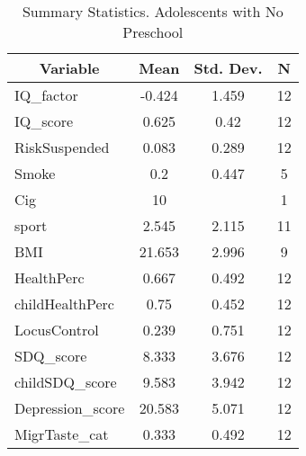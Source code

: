 
\begin{table}[htbp]\centering \caption{Summary Statistics. Adolescents with No Preschool \label{schoolAdolmaternaNone}}
\begin{tabular}{l c c  c}\hline\hline
\multicolumn{1}{c}{\textbf{Variable}} & \textbf{Mean}
 & \textbf{Std. Dev.} & \textbf{N}\\ \hline
IQ\_factor & -0.424 & 1.459  & 12\\
IQ\_score & 0.625 & 0.42  & 12\\
RiskSuspended & 0.083 & 0.289  & 12\\
Smoke & 0.2 & 0.447  & 5\\
Cig & 10 &   & 1\\
sport & 2.545 & 2.115  & 11\\
BMI & 21.653 & 2.996  & 9\\
HealthPerc & 0.667 & 0.492  & 12\\
childHealthPerc & 0.75 & 0.452  & 12\\
LocusControl & 0.239 & 0.751  & 12\\
SDQ\_score & 8.333 & 3.676  & 12\\
childSDQ\_score & 9.583 & 3.942  & 12\\
Depression\_score & 20.583 & 5.071  & 12\\
MigrTaste\_cat & 0.333 & 0.492  & 12\\
\hline\end{tabular}
\end{table}
